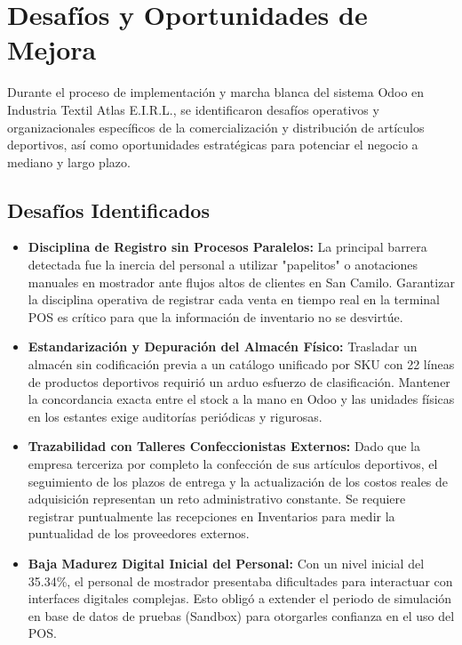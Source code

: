 \section{Desafíos y Oportunidades de Mejora}

Durante el proceso de implementación y marcha blanca del sistema Odoo en Industria Textil Atlas E.I.R.L., se identificaron desafíos operativos y organizacionales específicos de la comercialización y distribución de artículos deportivos, así como oportunidades estratégicas para potenciar el negocio a mediano y largo plazo.

\subsection{Desafíos Identificados}

\begin{itemize}
    \item \textbf{Disciplina de Registro sin Procesos Paralelos:} La principal barrera detectada fue la inercia del personal a utilizar "papelitos" o anotaciones manuales en mostrador ante flujos altos de clientes en San Camilo. Garantizar la disciplina operativa de registrar cada venta en tiempo real en la terminal POS es crítico para que la información de inventario no se desvirtúe.
    \item \textbf{Estandarización y Depuración del Almacén Físico:} Trasladar un almacén sin codificación previa a un catálogo unificado por SKU con 22 líneas de productos deportivos requirió un arduo esfuerzo de clasificación. Mantener la concordancia exacta entre el stock a la mano en Odoo y las unidades físicas en los estantes exige auditorías periódicas y rigurosas.
    \item \textbf{Trazabilidad con Talleres Confeccionistas Externos:} Dado que la empresa terceriza por completo la confección de sus artículos deportivos, el seguimiento de los plazos de entrega y la actualización de los costos reales de adquisición representan un reto administrativo constante. Se requiere registrar puntualmente las recepciones en Inventarios para medir la puntualidad de los proveedores externos.
    \item \textbf{Baja Madurez Digital Inicial del Personal:} Con un nivel inicial del 35.34\%, el personal de mostrador presentaba dificultades para interactuar con interfaces digitales complejas. Esto obligó a extender el periodo de simulación en base de datos de pruebas (Sandbox) para otorgarles confianza en el uso del POS.
\end{itemize}

